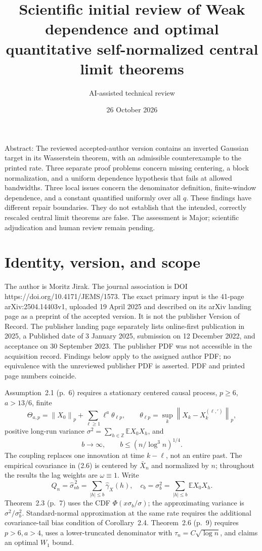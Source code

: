 \documentclass[10pt]{article}
\title{Scientific initial review of
Weak dependence and optimal quantitative self-normalized central limit theorems}
\author{AI-assisted technical review}
\date{26 October 2026}
\begin{document}
\maketitle
Abstract: The reviewed accepted-author version contains an inverted Gaussian target in its Wasserstein theorem, with an admissible counterexample to the printed rate. Three separate proof problems concern missing centering, a block normalization, and a uniform dependence hypothesis that fails at allowed bandwidths. Three local issues concern the denominator definition, finite-window dependence, and a constant quantified uniformly over all \(q\). These findings have different repair boundaries. They do not establish that the intended, correctly rescaled central limit theorems are false. The assessment is Major; scientific adjudication and human review remain pending.\par
\section*{Identity, version, and scope}
The author is Moritz Jirak. The journal association is DOI https://doi.org/10.4171/JEMS/1573. The exact primary input is the 41-page arXiv:2504.14403v1, uploaded 19 April 2025 and described on its arXiv landing page as a preprint of the accepted version. It is not the publisher Version of Record. The publisher landing page separately lists online-first publication in 2025, a Published date of 3 January 2025, submission on 12 December 2022, and acceptance on 30 September 2023. The publisher PDF was not accessible in the acquisition record. Findings below apply to the assigned author PDF; no equivalence with the unreviewed publisher PDF is asserted. PDF and printed page numbers coincide.\par
Assumption 2.1 (p. 6) requires a stationary centered causal process, \(p\ge6\), \(a>13/6\), finite \[\Theta_{a,p}=\left\|X_0\right\|_p+\sum_{\ell\ge1}\ell^a\theta_{\ell p},
\qquad
\theta_{\ell p}=\sup_k\left\|X_k-X_k^{(\ell,\prime)}\right\|_p,\] positive long-run variance \(\sigma^2=\sum_{h\in\mathbb Z}\mathbb EX_0X_h\), and \[b\longrightarrow\infty,\qquad b\le(n/\log^3n)^{1/4}.                 \tag{1.1}\] The coupling replaces one innovation at time \(k-\ell\), not an entire past. The empirical covariance in (2.6) is centered by \(\bar X_n\) and normalized by \(n\); throughout the results the lag weights are \(\omega\equiv1\). Write \[Q_n=\widehat\sigma_{nb}^{\,2}=\sum_{|h|\le b}\widehat\gamma_X(h),
\quad c_b=\sigma_b^2=\sum_{|h|\le b}\mathbb EX_0X_h .\] Theorem 2.3 (p. 7) uses the CDF \(\Phi(x\sigma_b/\sigma)\); the approximating variance is \(\sigma^2/\sigma_b^2\). Standard-normal approximation at the same rate requires the additional covariance-tail bias condition of Corollary 2.4. Theorem 2.6 (p. 9) requires \(p>6,a>4\), uses a lower-truncated denominator with \(\tau_n=C\sqrt{\log n}\), and claims an optimal \(W_1\) bound.\par
\end{document}
